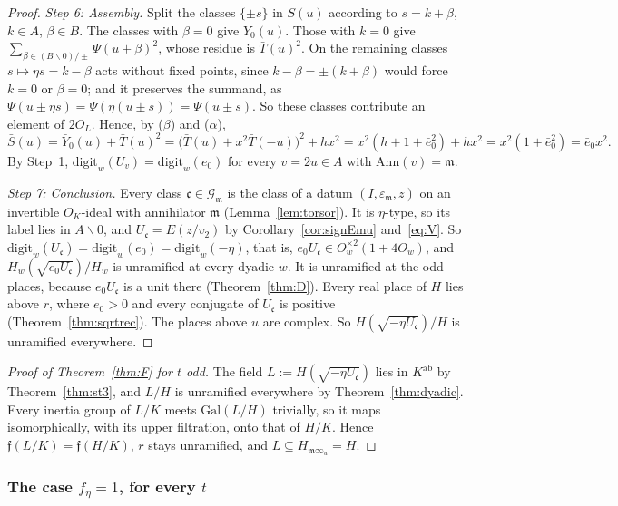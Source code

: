 \documentclass[11pt]{amsart}
\numberwithin{equation}{section}
\theoremstyle{plain}
\theoremstyle{definition}
\theoremstyle{remark}
\begin{document}
\begin{proof}
\emph{Step 6: Assembly.} Split the classes \(\{\pm s\}\) in \(S(u)\) according to \(s=k+\beta\), \(k\in A\), \(\beta\in B\). The classes with \(\beta=0\) give \(Y_0(u)\). Those with \(k=0\) give \(\sum_{\beta\in(B\smallsetminus0)/\pm}\Psi(u+\beta)^2\), whose residue is \(\bar T(u)^2\). On the remaining classes \(s\mapsto\eta s=k-\beta\) acts without fixed points, since \(k-\beta=\pm(k+\beta)\) would force \(k=0\) or \(\beta=0\); and it preserves the summand, as \(\Psi(u\pm\eta s)=\Psi(\eta(u\pm s))=\Psi(u\pm s)\). So these classes contribute an element of \(2O_L\). Hence, by (\(\beta\)) and (\(\alpha\)),
\[\bar S(u)=\bar Y_0(u)+\bar T(u)^2=\bigl(\bar T(u)+x^2\bar T(-u)\bigr)^2+hx^2=x^2(h+1+\bar e_0^2)+hx^2=x^2(1+\bar e_0^2)=\bar e_0x^2 .\]
By Step~1, \(\mathrm{digit}_w(U_v)=\mathrm{digit}_w(e_0)\) for every \(v=2u\in A\) with \(\mathrm{Ann}(v)=\mathfrak m\).

\emph{Step 7: Conclusion.} Every class \(\mathfrak c\in\mathcal G_{\mathfrak m}\) is the class of a datum \((I,\varepsilon_{\mathfrak m},z)\) on an invertible \(O_K\)-ideal with annihilator \(\mathfrak m\) (Lemma~\ref{lem:torsor}). It is \(\eta\)-type, so its label lies in \(A\smallsetminus0\), and \(U_{\mathfrak c}=E(z/v_2)\) by Corollary~\ref{cor:signEmu} and~\eqref{eq:V}. So \(\mathrm{digit}_w(U_{\mathfrak c})=\mathrm{digit}_w(e_0)=\mathrm{digit}_w(-\eta)\), that is, \(e_0U_{\mathfrak c}\in O_w^{\times2}(1+4O_w)\), and \(H_w(\sqrt{e_0U_{\mathfrak c}})/H_w\) is unramified at every dyadic \(w\). It is unramified at the odd places, because \(e_0U_{\mathfrak c}\) is a unit there (Theorem~\ref{thm:D}). Every real place of \(H\) lies above \(r\), where \(e_0>0\) and every conjugate of \(U_{\mathfrak c}\) is positive (Theorem~\ref{thm:sqrtrec}). The places above \(u\) are complex. So \(H(\sqrt{-\eta U_{\mathfrak c}})/H\) is unramified everywhere.
\end{proof}

\begin{proof}[Proof of Theorem~\ref{thm:F} for \(t\) odd]
The field \(L:=H(\sqrt{-\eta U_{\mathfrak c}})\) lies in \(K^{\mathrm{ab}}\) by Theorem~\ref{thm:st3}, and \(L/H\) is unramified everywhere by Theorem~\ref{thm:dyadic}. Every inertia group of \(L/K\) meets \(\mathrm{Gal}(L/H)\) trivially, so it maps isomorphically, with its upper filtration, onto that of \(H/K\). Hence \(\mathfrak f(L/K)=\mathfrak f(H/K)\), \(r\) stays unramified, and \(L\subseteq H_{\mathfrak m\infty_u}=H\).
\end{proof}

\subsubsection*{The case \(f_\eta=1\), for every \(t\)}
\end{document}
